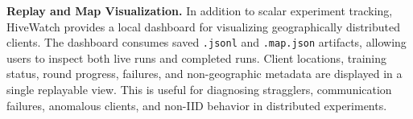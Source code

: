 \textbf{Replay and Map Visualization.}
In addition to scalar experiment tracking, HiveWatch provides a local dashboard
for visualizing geographically distributed clients. The dashboard consumes
saved \texttt{.jsonl} and \texttt{.map.json} artifacts, allowing users to
inspect both live runs and completed runs. Client locations, training status,
round progress, failures, and non-geographic metadata are displayed in a
single replayable view. This is useful for diagnosing stragglers, communication
failures, anomalous clients, and non-IID behavior in distributed experiments.